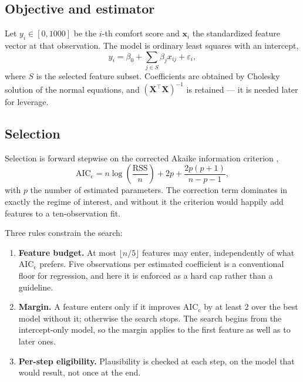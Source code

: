 \documentclass[11pt]{article}
\begin{document}
\subsection{Objective and estimator}

Let $y_i \in [0, 1000]$ be the $i$-th comfort score and $\mathbf{x}_i$ the
standardized feature vector at that observation. The model is ordinary least
squares with an intercept,
\begin{equation}
y_i = \beta_0 + \sum_{j \in S} \beta_j x_{ij} + \varepsilon_i ,
\end{equation}
where $S$ is the selected feature subset. Coefficients are obtained by Cholesky
solution of the normal equations, and $(\mathbf{X}^\top\mathbf{X})^{-1}$ is
retained --- it is needed later for leverage.

\subsection{Selection}

Selection is forward stepwise on the corrected Akaike information criterion
\citep{hurvich1989, burnham2002},
\begin{equation}
\mathrm{AIC_c} = n \log\!\left(\frac{\mathrm{RSS}}{n}\right) + 2p +
\frac{2p(p+1)}{n - p - 1},
\end{equation}
with $p$ the number of estimated parameters. The correction term dominates in
exactly the regime of interest, and without it the criterion would happily add
features to a ten-observation fit.

Three rules constrain the search:

\begin{enumerate}
\item \textbf{Feature budget.} At most $\lfloor n/5 \rfloor$ features may enter,
      independently of what $\mathrm{AIC_c}$ prefers. Five observations per
      estimated coefficient is a conventional floor for regression, and here it
      is enforced as a hard cap rather than a guideline.
\item \textbf{Margin.} A feature enters only if it improves $\mathrm{AIC_c}$ by
      at least 2 over the best model without it; otherwise the search stops.
      The search begins from the intercept-only model, so the margin applies to
      the first feature as well as to later ones.
\item \textbf{Per-step eligibility.} Plausibility is checked at each step, on
      the model that would result, not once at the end.
\end{enumerate}
\end{document}
